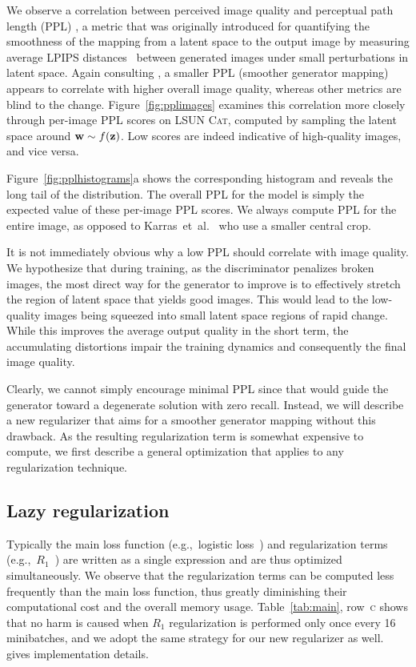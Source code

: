 \documentclass[10pt,twocolumn,letterpaper]{article}
\newcommand{\arch}[1]{\textsc{#1}}
\newcommand{\FINAL}[2][]{#2} %
\newcommand{\ww}{{\bf w}}
\begin{document}
\figpplimages %
\figpplhistograms %

We observe a correlation between perceived image quality and perceptual path length (PPL) \cite{Karras2018}, a metric that was originally introduced for quantifying the smoothness of the mapping from a latent space to the output image by measuring average LPIPS distances~\cite{Zhang2018metric} between generated images under small perturbations in latent space.
Again consulting , a smaller PPL (smoother generator mapping) appears to correlate with higher overall image quality, whereas other metrics are blind to the change.
\FINAL{Figure~\ref{fig:pplimages} examines this correlation more closely through per-image PPL scores on \textsc{LSUN Cat}, computed by sampling the latent space around $\ww \sim f(\mathbf{z})$. Low scores are indeed indicative of high-quality images, and vice versa.
}
Figure~\ref{fig:pplhistograms}a shows the corresponding histogram and reveals the long tail of the distribution.
The overall PPL for the model is simply the expected value of these per-image PPL scores. %
\FINAL{We always compute PPL for the entire image, as opposed to Karras~et~al.~\cite{Karras2018} who use a smaller central crop.}

It is not immediately obvious why a low PPL should correlate with image quality.
We hypothesize that during training, as the discriminator penalizes broken images, the most direct way for the generator to improve is to effectively stretch the region of latent space that yields good images.
This would lead to the low-quality images being squeezed into small latent space regions of rapid change. %
While this improves the average output quality in the short term, the accumulating distortions impair the training dynamics and consequently the final image quality.

\FINAL{
Clearly, we cannot simply encourage minimal PPL since that would guide the generator toward a degenerate solution with zero recall.
Instead, we will describe a new regularizer that aims for a smoother generator mapping without this drawback.}
As the resulting regularization term is somewhat expensive to compute, we first describe a general optimization that applies to \FINAL{any regularization technique.}

\subsection{Lazy regularization}
\label{sec:lazyreg}
Typically the main loss function (e.g.,~logistic loss~\cite{Goodfellow2014}) and regularization terms (e.g.,~$R_1$~\cite{Mescheder2018}) are written as a single expression and are thus optimized simultaneously.
We observe that the regularization terms can be computed less frequently than the main loss function, thus greatly diminishing their computational cost and the overall memory usage. 
Table~\ref{tab:main}, row~\arch{c} shows that no harm is caused when $R_1$ regularization is performed only once every 16 minibatches, and we adopt the same strategy for our new regularizer as well.
 gives implementation details.
\end{document}
